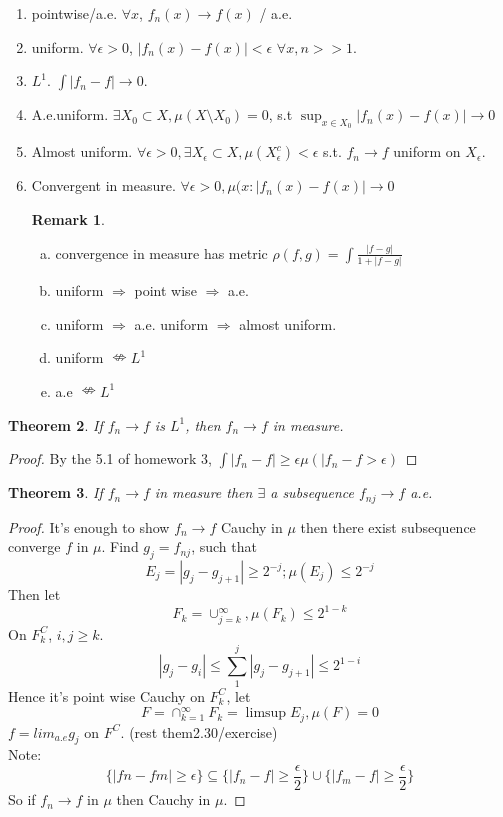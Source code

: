\documentclass{article}
\newtheorem{theorem}{Theorem}[section]
\theoremstyle{definition}
\newtheorem{remark}[theorem]{Remark}
\begin{document}
\begin{enumerate}[1)]
	\item pointwise/a.e. $\forall x$, $f_n(x)\rightarrow f(x)$ / a.e.
	\item uniform. $\forall \epsilon>0$, $|f_n(x)-f(x)|<\epsilon$ $\forall x, n>>1$.
	\item $L^1$. $\int |f_n-f| \rightarrow 0$.
	\item A.e.uniform. $\exists X_0\subset X,\mu(X\setminus X_0)=0$, s.t $\sup_{x\in X_0} |f_n(x)-f(x)|\rightarrow 0$
	\item Almost uniform. $\forall \epsilon>0, \exists X_{\epsilon}\subset X, \mu(X_{\epsilon}^{c})<\epsilon$ s.t. $f_n \rightarrow f$ uniform on $X_{\epsilon}$.
	\item Convergent in measure. $\forall \epsilon>0, \mu(x:|f_n(x)-f(x)|\rightarrow 0$
	
\begin{remark}
	\begin{enumerate}[(a)]
		\item convergence in measure has metric $\rho(f,g)=\int \frac{|f-g|}{1+|f-g|}$
		\item uniform $\Rightarrow$ point wise $\Rightarrow$ a.e.
		\item uniform $\Rightarrow$ a.e. uniform $\Rightarrow$ almost uniform.
		\item uniform $\nLeftrightarrow L^1$
		\item a.e $\nLeftrightarrow L^1$
	\end{enumerate}
\end{remark}
\end{enumerate}

\begin{theorem}
	If $f_n \rightarrow f$ is $L^1$, then $f_n \rightarrow f$ in measure.
\end{theorem}

\begin{proof}
	By the 5.1 of homework 3, $\int |f_n-f| \geq \epsilon \mu(|f_n-f>\epsilon)$
\end{proof}

\begin{theorem}
	If $f_n \rightarrow f$ in measure then $\exists$ a subsequence $f_{nj}\rightarrow f$ a.e.
\end{theorem}

\begin{proof}
	It's enough to show $f_n\rightarrow f$ Cauchy in $\mu$ then there exist subsequence converge $f$ in $\mu$.
	Find $g_j=f_{nj}$, such that $$E_j={|g_j-g_{j+1}|\geq 2^{-j}}; \mu(E_j)\leq 2^{-j}$$
	Then let $$F_k=\cup_{j = k}^{\infty}, \mu(F_k)\leq 2^{1-k}$$
	On $F_{k}^C$, $i,j\geq k$. $$|g_j-g_i|\leq \sum_{1}^{j}|g_j-g_{j+1}|\leq 2^{1-i}$$
	 Hence it's point wise Cauchy on $F_k^C$, let $$F=\cap_{k=1}^{\infty}F_k=\limsup E_j, \mu(F)=0$$ $f=lim_{a.e} g_j$ on $F^C$.
		(rest them2.30/exercise)\\
		Note: $$\{|fn-fm|\geq \epsilon \} \subseteq \{|f_n-f|\geq \frac{\epsilon}{2}\}\cup \{|f_m-f|\geq \frac{\epsilon}{2} \}$$ So if $f_n\rightarrow f $ in $\mu$ then Cauchy in $\mu$.
\end{proof}
\pagebreak
\end{document}

